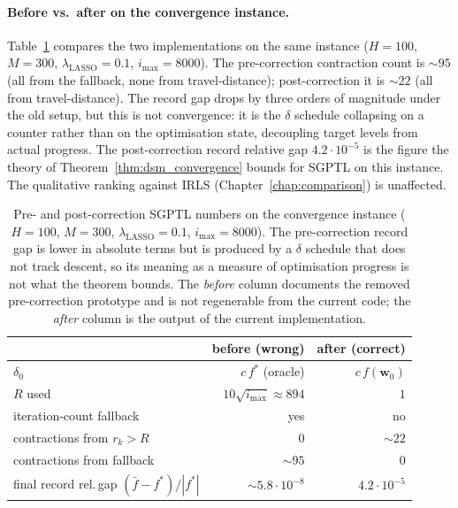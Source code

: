 \paragraph{Before vs.\ after on the convergence instance.}
Table~\ref{tab:before-after-numbers} compares the two implementations
on the same instance ($H=100$, $M=300$, $\lambda_\text{LASSO}=0.1$,
$i_{\max}=8000$). The pre-correction contraction count is $\sim\!95$
(all from the fallback, none from travel-distance); post-correction it
is $\sim\!22$ (all from travel-distance). The record gap drops by three
orders of magnitude under the old setup, but this is not convergence:
it is the $\delta$ schedule collapsing on a counter rather than on the
optimisation state, decoupling target levels from actual progress. The
post-correction record relative gap $4.2\cdot 10^{-5}$ is the figure the
theory of Theorem~\ref{thm:dsm_convergence} bounds for SGPTL on this instance.
The qualitative ranking against IRLS (Chapter~\ref{chap:comparison}) is
unaffected.

\begin{table}[H]
    \centering
    \small
    \setlength{\tabcolsep}{6pt}
    \begin{tabular}{lrr}
        \toprule
         & before (wrong) & after (correct) \\
        \midrule
        $\delta_{0}$                     & $c\,f^{*}$ (oracle) & $c\,f(\mathbf{w}_{0})$ \\
        $R$ used                         & $10\sqrt{i_{\max}}\approx 894$ & $1$ \\
        iteration-count fallback         & yes & no \\
        contractions from $r_{k}>R$       & $0$ & $\sim\!22$ \\
        contractions from fallback       & $\sim\!95$ & $0$ \\
        final record rel.\,gap $(\bar f - f^{*})/|f^{*}|$ & $\sim\!5.8\cdot 10^{-8}$ & $4.2\cdot 10^{-5}$ \\
        \bottomrule
    \end{tabular}
    \caption{Pre- and post-correction SGPTL numbers on the convergence
    instance ($H=100$, $M=300$, $\lambda_\text{LASSO}=0.1$,
    $i_{\max}=8000$). The pre-correction record gap is lower in absolute
    terms but is produced by a $\delta$ schedule that does not track
    descent, so its meaning as a measure of optimisation progress is
    not what the theorem bounds. The \emph{before} column documents the
    removed pre-correction prototype and is not regenerable from the current
    code; the \emph{after} column is the output of the current implementation.}
    \label{tab:before-after-numbers}
\end{table}
